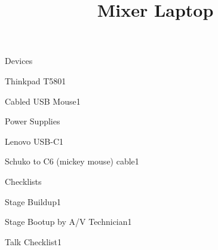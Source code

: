 \def\papersize{5}




\title{Mixer Laptop}

\begin{checklist}{Devices}
  \item{Thinkpad T580}{1}
  \item{Cabled USB Mouse}{1}
\end{checklist}

\begin{checklist}{Power Supplies}
  \item{Lenovo USB-C}{1}
  \item{Schuko to C6 (mickey mouse) cable}{1}
\end{checklist}

\begin{checklist}{Checklists}
  \item{Stage Buildup}{1}
  \item{Stage Bootup by A/V Technician}{1}
  \item{Talk Checklist}{1}
\end{checklist}


